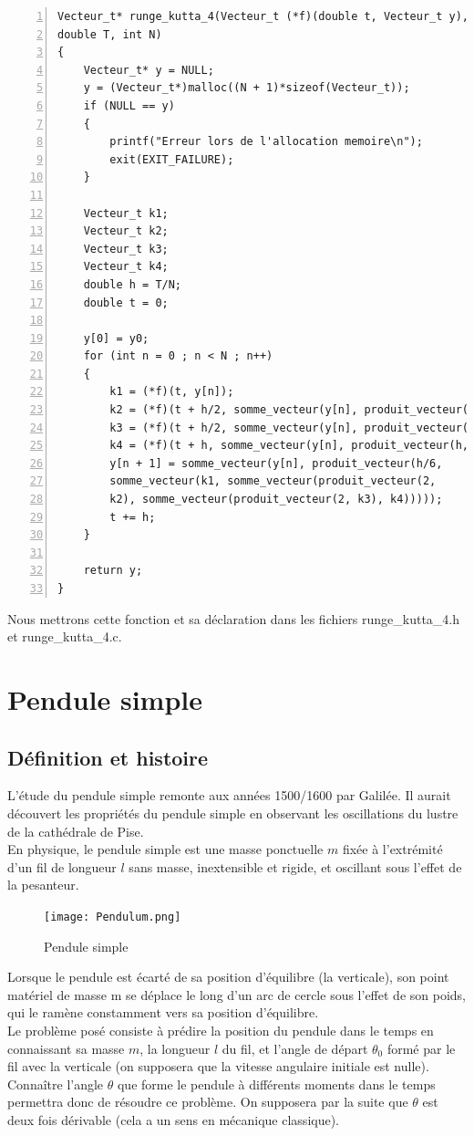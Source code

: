 \documentclass[9pt,a4paper]{article}
\begin{document}
\begin{Verbatim}[numbers=left, frame=single]
Vecteur_t* runge_kutta_4(Vecteur_t (*f)(double t, Vecteur_t y), Vecteur_t y0,
double T, int N)
{
    Vecteur_t* y = NULL;
    y = (Vecteur_t*)malloc((N + 1)*sizeof(Vecteur_t));
    if (NULL == y)
    {
        printf("Erreur lors de l'allocation memoire\n");
        exit(EXIT_FAILURE);
    }

    Vecteur_t k1;
    Vecteur_t k2;
    Vecteur_t k3;
    Vecteur_t k4;
    double h = T/N;
    double t = 0;

    y[0] = y0;
    for (int n = 0 ; n < N ; n++)
    {
        k1 = (*f)(t, y[n]);
        k2 = (*f)(t + h/2, somme_vecteur(y[n], produit_vecteur(h/2, k1)));
        k3 = (*f)(t + h/2, somme_vecteur(y[n], produit_vecteur(h/2, k2)));
        k4 = (*f)(t + h, somme_vecteur(y[n], produit_vecteur(h, k3)));
        y[n + 1] = somme_vecteur(y[n], produit_vecteur(h/6,
        somme_vecteur(k1, somme_vecteur(produit_vecteur(2,
        k2), somme_vecteur(produit_vecteur(2, k3), k4)))));
        t += h;
    }

    return y;
}
\end{Verbatim}
Nous mettrons cette fonction et sa déclaration dans les fichiers runge\_kutta\_4.h et runge\_kutta\_4.c.
\section{Pendule simple}
\subsection{Définition et histoire}
L'étude du pendule simple remonte aux années 1500/1600 par Galilée. Il aurait découvert les propriétés du pendule simple en observant les oscillations du lustre de la cathédrale de Pise.\\
En physique, le pendule simple est une masse ponctuelle $m$ fixée à l'extrémité d'un fil de longueur $l$ sans masse, inextensible et rigide, et oscillant sous l'effet de la pesanteur.
\begin{figure}
  \centering
  \texttt{[image: Pendulum.png]}
  \caption{Pendule simple}
  \label{fig:pendule simple}
\end{figure}
Lorsque le pendule est écarté de sa position d'équilibre (la verticale), son point matériel de masse m se déplace le long d'un arc de cercle sous l'effet de son poids, qui le ramène constamment vers sa position d'équilibre.\\
Le problème posé consiste à prédire la position du pendule dans le temps en connaissant sa masse $m$, la longueur $l$ du fil, et l'angle de départ $\theta_0$ formé par le fil avec la verticale (on supposera que la vitesse angulaire initiale est nulle). Connaître l'angle $\theta$ que forme le pendule à différents moments dans le temps permettra donc de résoudre ce problème. On supposera par la suite que $\theta$ est deux fois dérivable (cela a un sens en mécanique classique).
\end{document}
